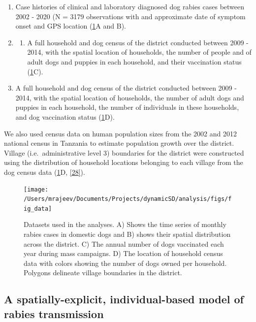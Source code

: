 \documentclass[
  oneside]{book}
\providecommand{\tightlist}{%
  \setlength{\itemsep}{0pt}\setlength{\parskip}{0pt}}
\begin{document}
\begin{enumerate}
\def\labelenumi{\arabic{enumi})}
\item
  Case histories of clinical and laboratory diagnosed dog rabies cases between 2002 - 2020 (N = 3179 observations with and approximate date of symptom onset and GPS location (\ref{fig:data}A and B).
\item
  \begin{enumerate}
  \def\labelenumii{\arabic{enumii})}
  \setcounter{enumii}{2}
  \tightlist
  \item
    A full household and dog census of the district conducted between 2009 - 2014, with the spatial location of households, the number of people and of adult dogs and puppies in each household, and their vaccination status (\ref{fig:data}C).
  \end{enumerate}
\item
  A full household and dog census of the district conducted between 2009 - 2014, with the spatial location of households, the number of adult dogs and puppies in each household, the number of individuals in these households, and dog vaccination status (\ref{fig:data}D).
\end{enumerate}

We also used census data on human population sizes from the 2002 and 2012 national census in Tanzania to estimate population growth over the district. Village (i.e.~administrative level 3) boundaries for the district were constructed using the distribution of household locations belonging to each village from the dog census data (\ref{fig:data}D, \protect\hyperlink{ref-Mancyinprep}{{[}28{]}}).

\begin{figure}
\texttt{[image: /Users/mrajeev/Documents/Projects/dynamicSD/analysis/figs/fig\_data]} \caption[Datasets on rabies cases, vaccination, and distribution of the dog population used in the analyses.]{Datasets used in the analyses. A) Shows the time series of monthly rabies cases in domestic dogs and B) shows their spatial distribution across the district. C) The annual number of dogs vaccinated each year during mass campaigns. D) The location of household census data with colors showing the number of dogs owned per household. Polygons delineate village boundaries in the district.}\label{fig:data}
\end{figure}



\hypertarget{a-spatially-explicit-individual-based-model-of-rabies-transmission}{%
\subsection{A spatially-explicit, individual-based model of rabies transmission}\label{a-spatially-explicit-individual-based-model-of-rabies-transmission}}
\end{document}
